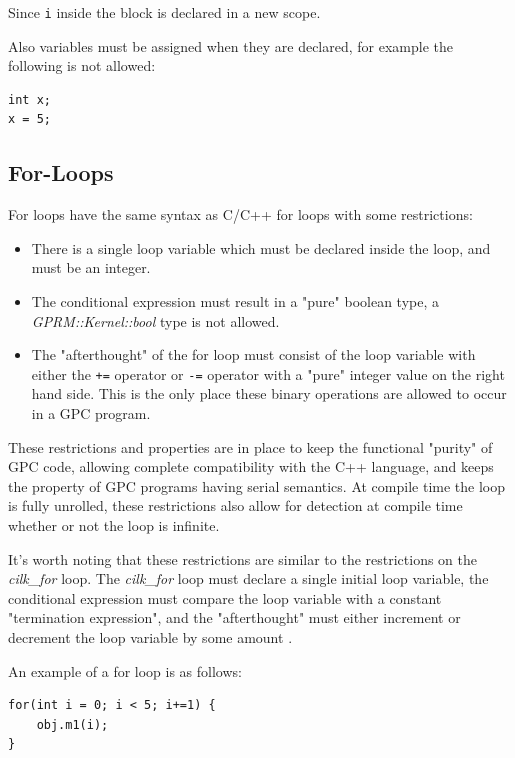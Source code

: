 Since \texttt{i} inside the block is declared in a new scope.

Also variables must be assigned when they are declared, for example the following is not allowed:

\begin{lstlisting}[style=myGPC]
int x;
x = 5;
\end{lstlisting}

\subsection{For-Loops}
For loops have the same syntax as C/C++ for loops with some restrictions:

\begin{itemize}
\item There is a single loop variable which must be declared inside the loop, and must be an integer.

\item The conditional expression must result in a "pure" boolean type, a \textit{GPRM::Kernel::bool}
     type is not allowed.

\item The "afterthought" of the for loop must consist of the loop variable with either the \texttt{+=} operator
      or \texttt{-=} operator with a "pure" integer value on the right hand side. This is the only place these
      binary operations are allowed to occur in a GPC program. 

\end{itemize}

These restrictions and properties are in place to keep the functional "purity" of GPC code,
allowing complete compatibility with the C++ language, and keeps the property of GPC programs
having serial semantics.  
At compile time the loop is fully unrolled, these restrictions also allow for detection
at compile time whether or not the loop is infinite.  

It's worth noting that these restrictions are similar to the restrictions on the \textit{cilk\_for} loop.
The \textit{cilk\_for} loop must declare a single initial loop variable, the conditional expression must 
compare the loop variable with a constant "termination expression", and the "afterthought" must either increment
or decrement the loop variable by some amount
\cite{cilkfor}.

An example of a for loop is as follows:


\begin{lstlisting}[style=myGPC]
for(int i = 0; i < 5; i+=1) {
    obj.m1(i);
}
\end{lstlisting}


